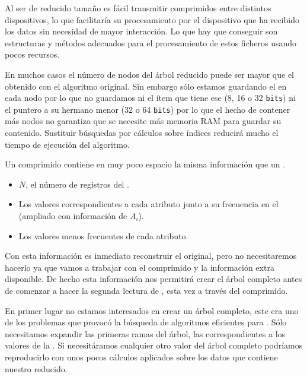 Al ser de reducido tamaño es fácil transmitir \catalogos comprimidos entre distintos dispositivos, lo que facilitaría su procesamiento por el dispositivo que ha recibido los datos sin necesidad de mayor interacción. Lo que hay que conseguir son estructuras y métodos adecuados para el procesamiento de estos ficheros usando pocos recursos.

En muchos casos el número de nodos del árbol reducido puede ser mayor que el obtenido con el algoritmo original. Sin embargo sólo estamos guardando el \soporte en cada nodo por lo que no guardamos ni el ítem que tiene ese \soporte (8, 16 o 32 \texttt{bits}) ni el puntero a su hermano menor (32 o 64 \texttt{bits}) por lo que el hecho de contener más nodos no garantiza que se necesite más memoria RAM para guardar su contenido. Sustituir búsquedas por cálculos sobre índices reducirá mucho el tiempo de ejecución del algoritmo.










Un \catalogo comprimido contiene en muy poco espacio la misma información que un \catalogo.
\begin{itemize}
   \item $N$, el número de registros del \catalogo.
   \item Los valores correspondientes a cada atributo junto a su frecuencia en el \catalogo (\aprioriC[1] ampliado con información de $A_i$).
   \item Los valores menos frecuentes de cada atributo.
\end{itemize}

Con esta información es inmediato reconstruir el \catalogo original, pero no necesitaremos hacerlo ya que vamos a trabajar con el \catalogo comprimido y la información extra disponible. De hecho esta información nos permitirá crear el árbol \aprioriL completo antes de comenzar a hacer la segunda lectura de \D, esta vez a través del \catalogo comprimido.

En primer lugar no estamos interesados en crear un árbol \aprioriL completo, este era uno de los problemas que provocó la búsqueda de algoritmos eficientes para \ARM. Sólo necesitamos expandir las primeras ramas del árbol, las correspondientes a los valores de la \clase. Si necesitáramos cualquier otro valor del árbol completo podríamos reproducirlo con unos pocos cálculos aplicados sobre los datos que contiene nuestro \aprioriL reducido.


